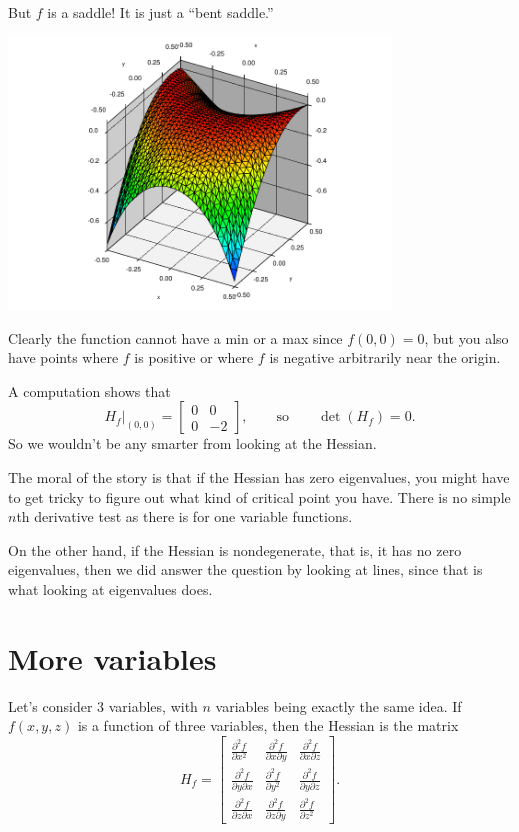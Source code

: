 \documentclass[12pt]{article}
\begin{document}
But $f$ is a saddle!  It is just a ``bent saddle.''
\begin{center}
\includegraphics[width=4.0in]{peanosurface}
\end{center}
Clearly the function cannot have a min or a max since $f(0,0)=0$, but you
also have points where $f$ is positive or where $f$ is negative arbitrarily
near the origin.

A computation shows that
$$
H_f\big|_{(0,0)} =
\begin{bmatrix}
0 & 0 \\
0 & -2
\end{bmatrix}
,
\qquad \text{so} \qquad
\det(H_f) = 0 .
$$
So we wouldn't be any smarter from looking at the Hessian.

The moral of the story is that if the Hessian has zero eigenvalues, you
might have to get tricky to figure out what kind of critical point you have.
There is no simple $n$th derivative test as there is for one variable functions.

On the other hand, if the Hessian is nondegenerate, that is, it has no
zero eigenvalues, then we did answer the question by looking at lines, since
that is what looking at eigenvalues does.

\section{More variables}

Let's consider 3 variables, with $n$ variables being exactly the same
idea.
If $f(x,y,z)$ is a function of three variables, then
the Hessian is the matrix
\begin{equation*}
H_f
=
\begin{bmatrix}
\frac{\partial^2 f}{\partial x^2} &
\frac{\partial^2 f}{\partial x \partial y} &
\frac{\partial^2 f}{\partial x \partial z}
\\
\frac{\partial^2 f}{\partial y \partial x} &
\frac{\partial^2 f}{\partial y^2} &
\frac{\partial^2 f}{\partial y \partial z}
\\
\frac{\partial^2 f}{\partial z \partial x} &
\frac{\partial^2 f}{\partial z \partial y} &
\frac{\partial^2 f}{\partial z^2}
\end{bmatrix} .
\end{equation*}
\end{document}
